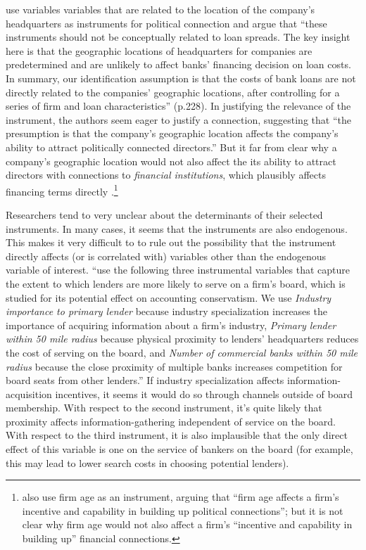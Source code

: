 \documentclass[11pt]{amsart}
\begin{document}
 \citet{Houston:2014hv} use variables variables that are related to the location of the company's headquarters as instruments for political connection and argue that ``these instruments should not be conceptually related to loan spreads. The key insight here is that the geographic locations of headquarters for companies are predetermined and are unlikely to affect banks' financing decision on loan costs. In summary, our identification assumption is that the costs of bank loans are not directly related to the companies' geographic locations, after controlling for a series of firm and loan characteristics'' (p.228). In justifying the relevance of the instrument, the authors seem eager to justify a connection, suggesting that ``the presumption is that the company's geographic location affects the company's ability to attract politically connected directors.'' But it far from clear why a company's geographic location would not also affect the its ability to attract directors with connections to \emph{financial institutions}, which plausibly affects financing terms directly \citep{Guner:2008tp}.\footnote{\citet{Houston:2014hv} also use firm age as an instrument, arguing that ``firm age affects a firm's incentive and capability in building up political connections''; but it is not clear why firm age would not also affect a firm's ``incentive and capability in building up'' financial connections.} 
 
Researchers tend to very unclear about the determinants of their selected instruments.  In many cases, it seems that the instruments are also endogenous.  This makes it very difficult to to rule out the possibility that the instrument directly affects (or is correlated with) variables other than the endogenous variable of interest.
 \citet{Erkens:2014hj} ``use the following three instrumental variables that capture the extent to which lenders are more likely to serve on a firm's board, which is studied for its potential effect on accounting conservatism. We use \emph{Industry importance to primary lender} because industry specialization increases the importance of acquiring information about a firm's industry, \emph{Primary lender within 50 mile radius} because physical proximity to lenders' headquarters reduces the cost of serving on the board, and \emph{Number of commercial banks within 50 mile radius} because the close proximity of multiple banks increases competition for board seats from other lenders.'' If industry specialization affects information-acquisition incentives, it seems it would do so through channels outside of board membership. With respect to the second instrument, it's quite likely that proximity affects information-gathering independent of service on the board. With respect to the third instrument, it is also implausible that the only direct effect of this variable is one on the service of bankers on the board (for example, this may lead to lower search costs in choosing potential lenders).
 
\end{document}
